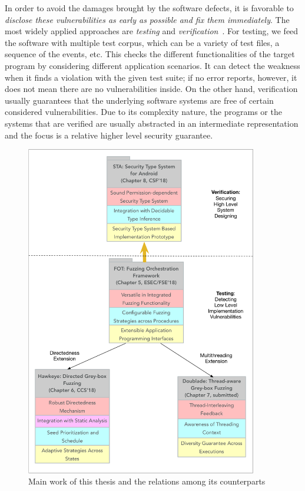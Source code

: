 In order to avoid the damages brought by the software defects, it is favorable to \emph{disclose these vulnerabilities as early as possible and fix them immediately}. The most widely applied approaches are \emph{testing} and \emph{verification}~\cite{Hailpern:2002:SDT:1660992.1660994,Felderer:2016:MST:2904681.2904685,mc-at}. For testing, we feed the software with multiple test corpus, which can be a variety of test files, a sequence of the events, etc. This checks the different functionalities of the target program by considering different application scenarios. It can detect the weakness when it finds a violation with the given test suite; if no error reports, however, it does not mean there are no vulnerabilities inside. On the other hand, verification usually guarantees that the underlying software systems are free of certain considered vulnerabilities. Due to its complexity nature, the programs or the systems that are verified are usually abstracted in an intermediate representation and the focus is a relative higher level security guarantee.

\begin{figure}[ht]
	\begin{center}
		\includegraphics[width=0.9\textwidth]{res/contributions}
		\caption{Main work of this thesis and the relations among its counterparts}
		\label{fig:works}
	\end{center}
\end{figure}


